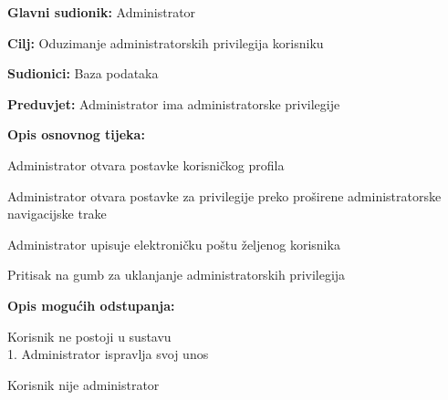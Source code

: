 					\noindent {}
					\begin{packed_item}
						\item \textbf{Glavni sudionik:} Administrator
						\item \textbf{Cilj:} Oduzimanje administratorskih privilegija korisniku
						\item \textbf{Sudionici:} Baza podataka
						\item \textbf{Preduvjet:} Administrator ima administratorske privilegije
						\item \textbf{Opis osnovnog tijeka:}
						\begin{packed_enum}
							\item Administrator otvara postavke korisničkog profila
							\item Administrator otvara postavke za privilegije preko proširene administratorske navigacijske trake
							\item Administrator upisuje elektroničku poštu željenog korisnika 
							\item Pritisak na gumb za uklanjanje administratorskih privilegija
						\end{packed_enum}
						\item \textbf{Opis mogućih odstupanja:}
						\begin{packed_item}
							\item [3.a] Korisnik ne postoji u sustavu
							\\1. Administrator ispravlja svoj unos
							\item [4.a] Korisnik nije administrator
						\end{packed_item}
					\end{packed_item}


